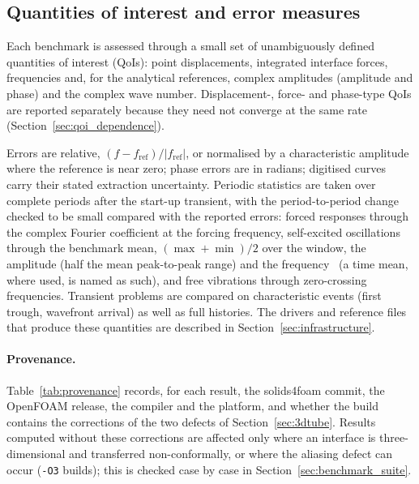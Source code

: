 \subsection{Quantities of interest and error measures}\label{sec:qoi}

Each benchmark is assessed through a small set of unambiguously defined quantities of interest (QoIs): point displacements, integrated interface forces, frequencies and, for the analytical references, complex amplitudes (amplitude and phase) and the complex wave number.
Displacement-, force- and phase-type QoIs are reported separately because they need not converge at the same rate (Section~\ref{sec:qoi_dependence}).

Errors are relative, $(f - f_\mathrm{ref})/|f_\mathrm{ref}|$, or normalised by a characteristic amplitude where the reference is near zero; phase errors are in radians; digitised curves carry their stated extraction uncertainty.
Periodic statistics are taken over complete periods after the start-up transient, with the period-to-period change checked to be small compared with the reported errors: forced responses through the complex Fourier coefficient at the forcing frequency, self-excited oscillations through the benchmark mean, $(\max+\min)/2$ over the window, the amplitude (half the mean peak-to-peak range) and the frequency~\citep{Turek2006} (a time mean, where used, is named as such), and free vibrations through zero-crossing frequencies.
Transient problems are compared on characteristic events (first trough, wavefront arrival) as well as full histories.
The drivers and reference files that produce these quantities are described in Section~\ref{sec:infrastructure}.
\paragraph{Provenance.}
Table~\ref{tab:provenance} records, for each result, the solids4foam commit, the OpenFOAM release, the compiler and the platform, and whether the build contains the corrections of the two defects of Section~\ref{sec:3dtube}.
Results computed without these corrections are affected only where an interface is three-dimensional and transferred non-conformally, or where the aliasing defect can occur (\texttt{-O3} builds); this is checked case by case in Section~\ref{sec:benchmark_suite}.

